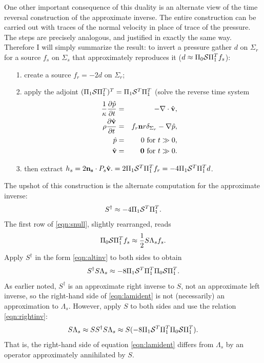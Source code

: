 \documentclass[12pt]{geophysics}
\newcommand{\bv}{\mathbf{v}}
\begin{document}
One other important consequence of this duality is an alternate view
of the time reversal construction of the approximate inverse. The
entire construction can be carried out with traces of the normal
velocity in place of trace of the pressure. The steps are precisely
analogous, and justified in exactly the same way. Therefore I will
simply summarize the result:
to invert a pressure gather $d$ on $\Sigma_r$
for a source $f_s$ on $\Sigma_s$ that approximately reproduces it ($d
\approx \Pi_0{\cal S}\Pi_1^Tf_s$):
\begin{itemize}
\item[1. ] create a source $f_r = - 2d$ on $\Sigma_r$;
\item[2. ] apply the adjoint $(\Pi_1{\cal S}\Pi_1^T)^T=\Pi_1{\cal
    S}^T\Pi_1^T$ (solve the reverse time system
  \begin{eqnarray}
  \label{eqn:awerecglobvz}
  \frac{1}{\kappa}\frac{\partial\hat{p}}{\partial t} & = & 
                                                      - \nabla \cdot \hat{\bv}, \nonumber \\
  \rho\frac{\partial \hat{\bv}}{\partial t} & = & f_r {\bf n}r
  \delta_{\Sigma_r} - \nabla \hat{p}, \nonumber \\
  \hat{p} & = & 0 \mbox{ for } t\gg 0, \nonumber \\
    \hat{\bv} & = & {\bf 0} \mbox{ for } t \gg 0.
  \end{eqnarray}
\item[3. ]
  then extract $h_s=2{\bf n_s}\cdot P_s\hat{\bv}. = 2\Pi_1{\cal
    S}^T\Pi_1^Tf_r=-4\Pi_1{\cal S}^T\Pi_1^Td$.
\end{itemize}
The upshot of this construction is the alternate computation for the
approximate inverse:
\begin{equation}
  \label{eqn:altinv}
  S^{\dagger}  \approx -4\Pi_1{\cal S}^T\Pi_1^T.
\end{equation}
The first row of
\ref{eqn:snull}, slightly rearranged, reads
\begin{equation}
  \label{eqn:lamidea}
  \Pi_0{\cal S}\Pi_1^T f_s \approx  \frac{1}{2} S\Lambda_sf_s.
\end{equation}
Apply $S^{\dagger}$ in the form \ref{eqn:altinv} to both sides to obtain
\begin{equation}
  \label{eqn:lamident}
 S^{\dagger} S \Lambda_s \approx -8\Pi_1{\cal S}^T\Pi_1^T\Pi_0 {\cal S}\Pi_1^T.
\end{equation}
As earlier noted, $S^{\dagger}$ is an approximate right inverse to
$S$, not an approximate left inverse, so the right-hand side of
\ref{eqn:lamident} is not (necessarily) an approximation to
$\Lambda_s$. However, apply $S$ to both sides and use the relation
\ref{eqn:rightinv}:
\begin{equation}
  \label{eqn:goodenuf}
 S \Lambda_s \approx SS^{\dagger} S \Lambda_s \approx S(-8\Pi_1{\cal S}^T\Pi_1^T\Pi_0 {\cal S}\Pi_1^T).
\end{equation}
That is, the right-hand side of equation \ref{eqn:lamident} differs
from $\Lambda_s$ by an operator approximately annihilated by $S$.
\end{document}
